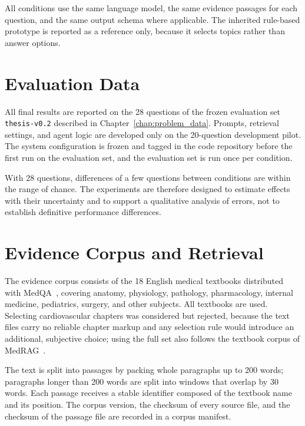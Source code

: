 All conditions use the same language model, the same evidence passages for each question, and the same output schema where applicable. The inherited rule-based prototype is reported as a reference only, because it selects topics rather than answer options.

\section{Evaluation Data}
\label{sec:eval_data}

All final results are reported on the 28 questions of the frozen evaluation set \texttt{thesis-v0.2} described in Chapter~\ref{chap:problem_data}. Prompts, retrieval settings, and agent logic are developed only on the 20-question development pilot. The system configuration is frozen and tagged in the code repository before the first run on the evaluation set, and the evaluation set is run once per condition.

With 28 questions, differences of a few questions between conditions are within the range of chance. The experiments are therefore designed to estimate effects with their uncertainty and to support a qualitative analysis of errors, not to establish definitive performance differences.

\section{Evidence Corpus and Retrieval}
\label{sec:corpus}

The evidence corpus consists of the 18 English medical textbooks distributed with MedQA~\cite{jin_medqa_2021}, covering anatomy, physiology, pathology, pharmacology, internal medicine, pediatrics, surgery, and other subjects. All textbooks are used. Selecting cardiovascular chapters was considered but rejected, because the text files carry no reliable chapter markup and any selection rule would introduce an additional, subjective choice; using the full set also follows the textbook corpus of MedRAG~\cite{xiong_medrag_2024}.

The text is split into passages by packing whole paragraphs up to 200 words; paragraphs longer than 200 words are split into windows that overlap by 30 words. Each passage receives a stable identifier composed of the textbook name and its position. The corpus version, the checksum of every source file, and the checksum of the passage file are recorded in a corpus manifest. 


